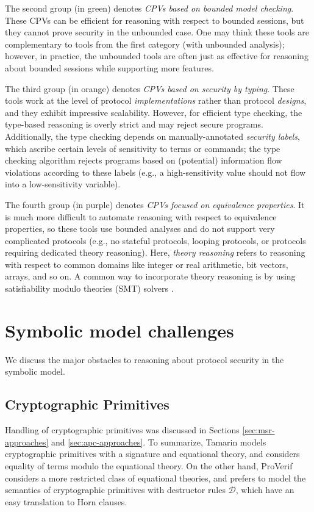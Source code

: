\documentclass{article}
\theoremstyle{definition}
\begin{document}
The second group (in green) denotes \emph{CPVs based on bounded model checking}. 
These CPVs can be efficient for reasoning with respect to bounded sessions, 
but they cannot prove security in the unbounded case. One may think these tools are complementary 
to tools from the first category (with unbounded analysis); 
however, in practice, the unbounded tools are often just as effective for reasoning about bounded sessions 
\cite{sok} while supporting more features. 

The third group (in orange) denotes \emph{CPVs based on security by typing}. 
These tools work at the level of protocol \emph{implementations} rather than protocol \emph{designs}, 
and they exhibit impressive scalability. However, for efficient type checking, the type-based reasoning 
is overly strict and may reject secure programs. Additionally, 
the type checking depends on manually-annotated \emph{security labels}, which ascribe certain levels 
of sensitivity to terms or commands; the type checking algorithm rejects programs based on (potential) 
information flow violations according to these labels 
(e.g., a high-sensitivity value should not flow into a low-sensitivity variable).

The fourth group (in purple) denotes \emph{CPVs focused on equivalence properties}. 
It is much more difficult to automate reasoning with respect to equivalence properties, 
so these tools use bounded analyses and do not support very complicated protocols 
(e.g., no stateful protocols, looping protocols, or protocols requiring dedicated theory reasoning). 
Here, \emph{theory reasoning} refers to reasoning with respect to common domains like 
integer or real arithmetic, bit vectors, arrays, and so on.
A common way to incorporate theory reasoning is by using satisfiability modulo theories (SMT) solvers \cite{smt}.




\section{Symbolic model challenges}\label{sec:challenges}
We discuss the major obstacles to reasoning about protocol security in the symbolic model. 

\subsection{Cryptographic Primitives}

Handling of cryptographic primitives was discussed in Sections \ref{sec:msr-approaches} and \ref{sec:apc-approaches}. 
To summarize, Tamarin models cryptographic primitives with a signature and equational theory, 
and considers equality of terms modulo the equational theory. 
On the other hand, ProVerif considers a more restricted class of equational theories, 
and prefers to model the semantics of cryptographic primitives with destructor rules $\mathcal{D}$, 
which have an easy translation to Horn clauses.
\end{document}
